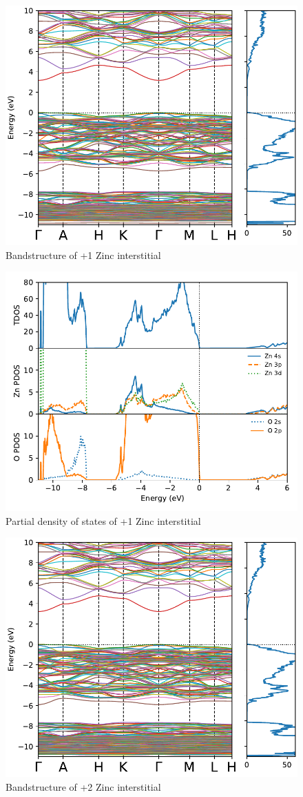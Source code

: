 \begin{figure}[tbh!]
	\centering
	\includegraphics[width=0.6\linewidth]{"images/rnd/band-dos_Zn_i-p1"}
	\caption[Bandstructure of +1 Zinc interstitial]{Bandstructure of +1 Zinc interstitial}
\end{figure}

\begin{figure}[tbh!]
	\centering
	\includegraphics[width=0.6\linewidth]{"images/rnd/dos-pdos_Zn_i-p1"}
	\caption[Partial density of states of +1 Zinc interstitial]{Partial density of states of +1 Zinc interstitial }
\end{figure}


\begin{figure}[tbh!]
	\centering
	\includegraphics[width=0.6\linewidth]{"images/rnd/band-dos_Zn_i-p2"}
	\caption[Bandstructure of +2 Zinc interstitial]{Bandstructure of +2 Zinc interstitial}
\end{figure}

